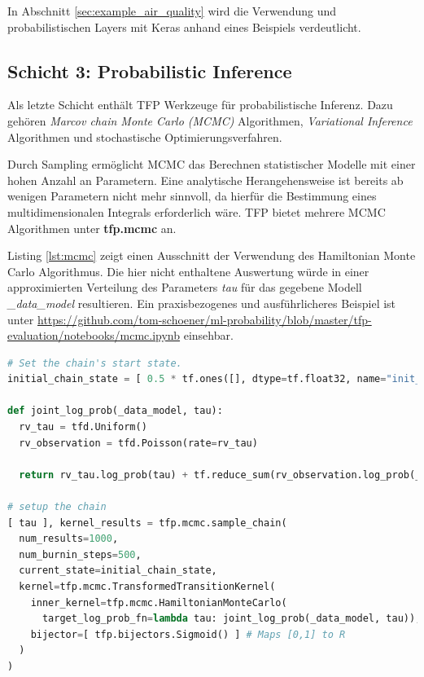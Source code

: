 \documentclass[12pt]{article}
\begin{document}
In Abschnitt \ref{sec:example_air_quality} wird die Verwendung und probabilistischen Layers mit Keras anhand eines Beispiels verdeutlicht.

\subsection{Schicht 3: Probabilistic Inference}
\label{sec:layer3}
Als letzte Schicht enthält TFP Werkzeuge für probabilistische Inferenz. Dazu gehören \textit{Marcov chain Monte Carlo (MCMC)} Algorithmen, \textit{Variational Inference} Algorithmen und stochastische Optimierungsverfahren. 

Durch Sampling ermöglicht MCMC das Berechnen statistischer Modelle mit einer hohen Anzahl an Parametern. Eine analytische Herangehensweise ist bereits ab wenigen Parametern nicht mehr sinnvoll, da hierfür die Bestimmung eines multidimensionalen Integrals erforderlich wäre. TFP bietet mehrere MCMC Algorithmen unter \textbf{tfp.mcmc} an. 

Listing \ref{lst:mcmc} zeigt einen Ausschnitt der Verwendung des Hamiltonian Monte Carlo Algorithmus. Die hier nicht enthaltene Auswertung würde in einer approximierten Verteilung des Parameters \textit{tau} für das gegebene Modell \textit{\_data\_model} resultieren. Ein praxisbezogenes und ausführlicheres Beispiel ist unter \url{https://github.com/tom-schoener/ml-probability/blob/master/tfp-evaluation/notebooks/mcmc.ipynb} einsehbar.

\begin{lstlisting}[language=Python, caption={Verwendung des Hamiltonian Monte Carlo Algorithmus (gekürzt)}, label={lst:mcmc}]
# Set the chain's start state.
initial_chain_state = [ 0.5 * tf.ones([], dtype=tf.float32, name="init_tau") ]

def joint_log_prob(_data_model, tau):
  rv_tau = tfd.Uniform()
  rv_observation = tfd.Poisson(rate=rv_tau)

  return rv_tau.log_prob(tau) + tf.reduce_sum(rv_observation.log_prob(_data_model))

# setup the chain
[ tau ], kernel_results = tfp.mcmc.sample_chain(
  num_results=1000,
  num_burnin_steps=500,
  current_state=initial_chain_state,
  kernel=tfp.mcmc.TransformedTransitionKernel(
    inner_kernel=tfp.mcmc.HamiltonianMonteCarlo(
      target_log_prob_fn=lambda tau: joint_log_prob(_data_model, tau)),
    bijector=[ tfp.bijectors.Sigmoid() ] # Maps [0,1] to R  
  )
)
\end{lstlisting}
\end{document}
